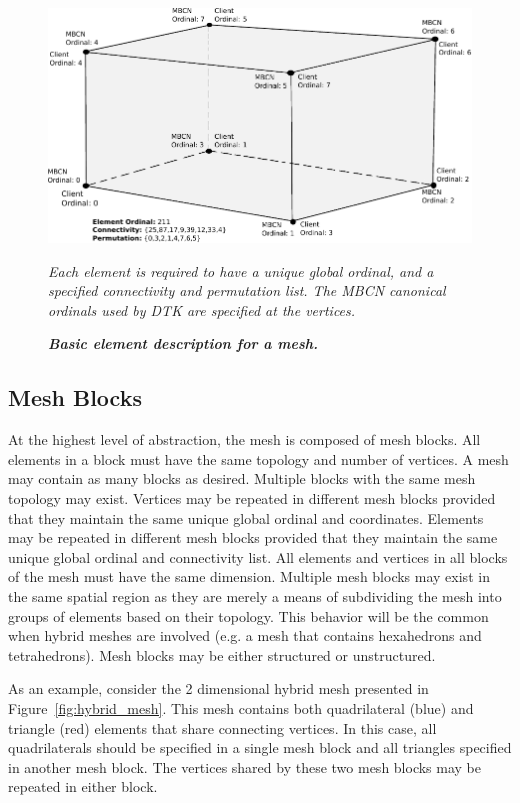 \documentclass[letterpaper,12pt]{article}
\begin{document}
\begin{figure}[htpb!]
  \centering \includegraphics[width=5in]{hex_element.pdf}
  \caption{\bf \sl Basic element description for a mesh.}{\sl Each
    element is required to have a unique global ordinal, and a
    specified connectivity and permutation list. The MBCN canonical
    ordinals used by DTK are specified at the vertices.}
  \label{fig:mesh_element}
\end{figure}

\subsection{Mesh Blocks}\label{subsec:blocks}
At the highest level of abstraction, the mesh is composed of mesh
blocks. All elements in a block must have the same topology and number
of vertices. A mesh may contain as many blocks as desired. Multiple
blocks with the same mesh topology may exist. Vertices may be repeated
in different mesh blocks provided that they maintain the same unique
global ordinal and coordinates. Elements may be repeated in different
mesh blocks provided that they maintain the same unique global ordinal
and connectivity list. All elements and vertices in all blocks of the
mesh must have the same dimension. Multiple mesh blocks may exist in
the same spatial region as they are merely a means of subdividing the
mesh into groups of elements based on their topology. This behavior
will be the common when hybrid meshes are involved (e.g. a mesh that
contains hexahedrons and tetrahedrons). Mesh blocks may be either
structured or unstructured.

As an example, consider the 2 dimensional hybrid mesh presented in
Figure~\ref{fig:hybrid_mesh}. This mesh contains both quadrilateral
(blue) and triangle (red) elements that share connecting vertices. In
this case, all quadrilaterals should be specified in a single mesh
block and all triangles specified in another mesh block. The vertices
shared by these two mesh blocks may be repeated in either block.
\end{document}
